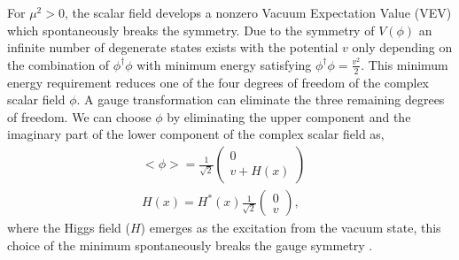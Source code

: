 For $\mu^2 > 0$, the scalar field develops a nonzero Vacuum Expectation Value (VEV) which spontaneously breaks the symmetry. Due to the symmetry of $V(\phi)$ an infinite number of degenerate states exists with the potential $v$ only depending on the combination of $\phi^{\dagger}\phi$ 
\cite{PeskinQFT} with minimum energy satisfying $\phi^{\dagger}\phi = \frac{v^2}{2}$. This minimum energy requirement reduces one of the four degrees of freedom of the complex scalar field $\phi$. A gauge transformation can eliminate the three remaining degrees of freedom. We can choose $\phi$ by eliminating the upper component and the imaginary part of the lower component of the complex scalar field as,
\begin{equation}
\begin{array}{l}
<\phi> = \frac{1}{\sqrt{2}}\begin{pmatrix} 0 \\ v+H(x) \end{pmatrix}~ \hspace{10pt} \\
H(x) = H^{*}(x)\frac{1}{\sqrt{2}} \begin{pmatrix} 0 \\ v \end{pmatrix},
\end{array}
\label{eqn:ScalarExp}
\end{equation}
where the Higgs field ($H$) emerges as the excitation from the vacuum state, this choice of the minimum spontaneously breaks the gauge symmetry \cite{DESYHiggsLecture}. 

